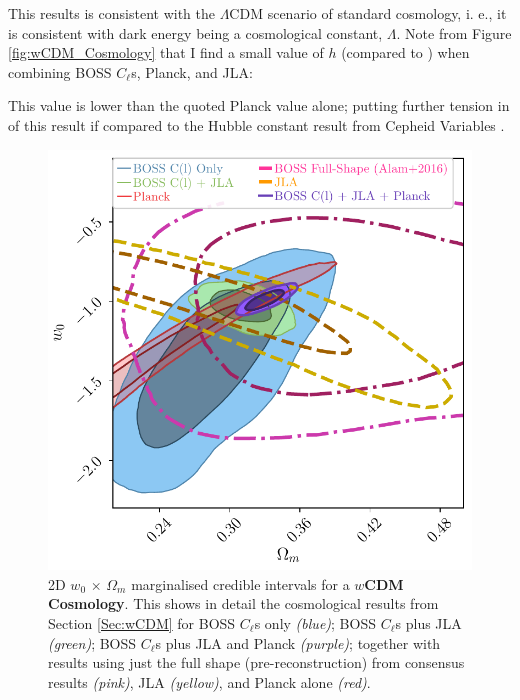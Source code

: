 This results is consistent with the $\Lambda$CDM scenario of standard cosmology, i. e., it is consistent with dark energy being a cosmological constant, $\Lambda$. Note from Figure \ref{fig:wCDM_Cosmology} that I find a small value of $h$ (compared to \citealt{PlanckCosmology2016}) when combining BOSS $C_{\ell}$s, Planck, and JLA:

 This value is lower than the quoted Planck value alone; putting further tension in of this result if compared to the Hubble constant result from Cepheid Variables \citep{Riess2016, Riess2018}. 

\begin{figure}
\begin{center}
\includegraphics[scale=0.70]{BOSS-FIGS/w0_Om_wCDM.pdf}
\caption[2D $w_0 \, \times \, \Omega_m$ marginalised credible intervals for a $w$CDM Cosmology.]{2D $w_0 \, \times \, \Omega_m$ marginalised credible intervals for a \textbf{$w$CDM Cosmology}. This shows in detail the cosmological results from Section \ref{Sec:wCDM} for BOSS $C_{\ell}$s only \textit{(blue)}; BOSS $C_{\ell}$s plus JLA \textit{(green)}; BOSS $C_{\ell}$s plus JLA and Planck \textit{(purple)}; together with results using just the full shape (pre-reconstruction) from \protect\cite{2016BOSSCosmology} consensus results \textit{(pink)}, JLA \textit{(yellow)}, and Planck alone \textit{(red)}.}
\label{fig:Om_w0_wCDM}
\end{center}
\end{figure}

